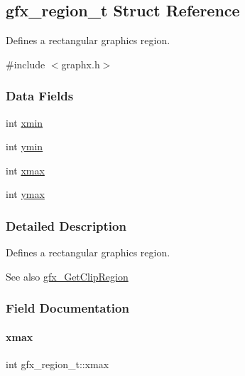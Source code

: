 \hypertarget{structgfx__region__t}{}\subsection{gfx\+\_\+region\+\_\+t Struct Reference}
\label{structgfx__region__t}


Defines a rectangular graphics region.  




{\ttfamily \#include $<$graphx.\+h$>$}

\subsubsection*{Data Fields}
\begin{DoxyCompactItemize}
\item 
int \hyperlink{structgfx__region__t_aca46800ecb570cb10cdb5ef93b65f32b}{xmin}
\item 
int \hyperlink{structgfx__region__t_a1dcbb75f8713584c7c8808618075ad48}{ymin}
\item 
int \hyperlink{structgfx__region__t_a9cb0f9b72a653070323de3d55fa8a814}{xmax}
\item 
int \hyperlink{structgfx__region__t_aeef728b14af6648346d4b2aa5d438268}{ymax}
\end{DoxyCompactItemize}


\subsubsection{Detailed Description}
Defines a rectangular graphics region. 

\begin{DoxySeeAlso}{See also}
\hyperlink{graphx_8h_aa791a7979dcf85013b5e350733eb57e5}{gfx\+\_\+\+Get\+Clip\+Region} 
\end{DoxySeeAlso}


\subsubsection{Field Documentation}
\mbox{\label{structgfx__region__t_a9cb0f9b72a653070323de3d55fa8a814}} 
\paragraph{\texorpdfstring{xmax}{xmax}}
{\footnotesize\ttfamily int gfx\+\_\+region\+\_\+t\+::xmax}

